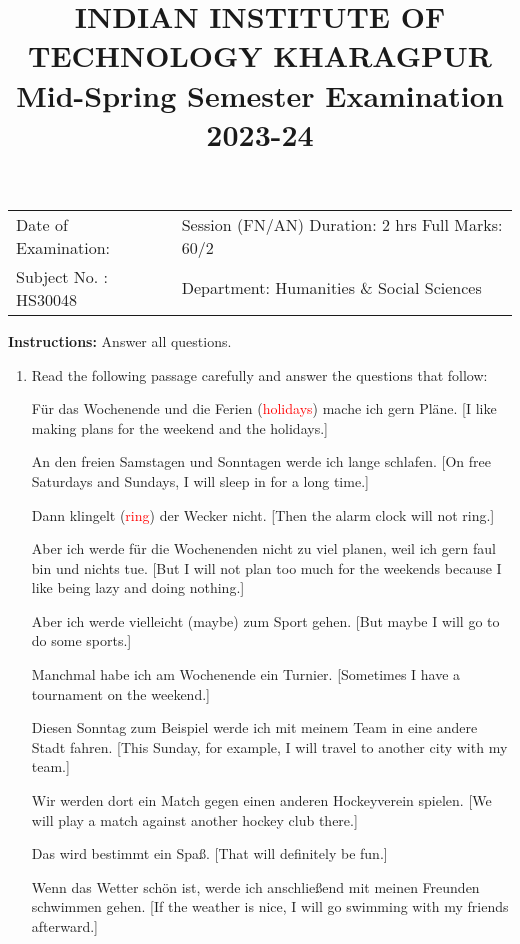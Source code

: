 \documentclass{article}
\title{INDIAN INSTITUTE OF TECHNOLOGY KHARAGPUR \\ Mid-Spring Semester Examination 2023-24}
\date{}
\begin{document}
\maketitle
\begin{center}
\begin{tabular}{ll}
Date of Examination: & Session (FN/AN) Duration: 2 hrs Full Marks: 60/2 \\
Subject No. : HS30048 & Department: Humanities \& Social Sciences
\end{tabular}
\end{center}

\noindent \textbf{Instructions:} Answer all questions.

\begin{enumerate}
    \item Read the following passage carefully and answer the questions that follow:

    Für das Wochenende und die Ferien (\textcolor{red}{holidays}) mache ich gern Pläne. [I like making plans for the weekend and the holidays.]

    An den freien Samstagen und Sonntagen werde ich lange schlafen. [On free Saturdays and Sundays, I will sleep in for a long time.]
    
    Dann klingelt (\textcolor{red}{ring}) der Wecker nicht. [Then the alarm clock will not ring.]
    
    Aber ich werde für die Wochenenden nicht zu viel planen, weil ich gern faul bin und nichts tue. [But I will not plan too much for the weekends because I like being lazy and doing nothing.]
    
    Aber ich werde vielleicht (maybe) zum Sport gehen. [But maybe I will go to do some sports.]
    
    Manchmal habe ich am Wochenende ein Turnier. [Sometimes I have a tournament on the weekend.]
    
    Diesen Sonntag zum Beispiel werde ich mit meinem Team in eine andere Stadt fahren. [This Sunday, for example, I will travel to another city with my team.]
    
    Wir werden dort ein Match gegen einen anderen Hockeyverein spielen. [We will play a match against another hockey club there.]
    
    Das wird bestimmt ein Spaß. [That will definitely be fun.]
    
    Wenn das Wetter schön ist, werde ich anschließend mit meinen Freunden schwimmen gehen. [If the weather is nice, I will go swimming with my friends afterward.]
    

\end{enumerate}
\end{document}
